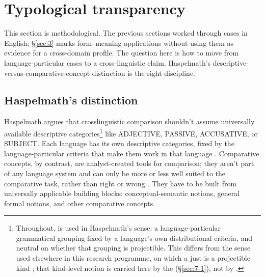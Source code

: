 \section{Typological transparency}\label{sec:6}

This section is methodological. The previous sections worked through cases in English; §\ref{sec:3} marks form--meaning applications without using them as evidence for a cross-domain profile. The question here is how to move from language-particular cases to a cross-linguistic claim. Haspelmath's \autocite*{haspelmath-2010-comparative-concepts} descriptive-versus-comparative-concept distinction is the right discipline.

\subsection{Haspelmath's distinction}

Haspelmath \autocite*{haspelmath-2010-comparative-concepts} argues that crosslinguistic comparison shouldn't assume universally available descriptive categories\footnote{Throughout,  is used in Haspelmath's  sense: a language-particular grammatical grouping fixed by a language's own distributional criteria, and neutral on whether that grouping is projectible. This differs from the sense used elsewhere in this research programme, on which a  just is a projectible kind \autocite{reynolds2025hpcbook}; that kind-level notion is carried here by the  (§\ref{sec:7-1}), not by .} like ADJECTIVE, PASSIVE, ACCUSATIVE, or SUBJECT. Each language has its own descriptive categories, fixed by the language-particular criteria that make them work in that language \autocite[664]{haspelmath-2010-comparative-concepts}. Comparative concepts, by contrast, are analyst-created tools for comparison; they aren't part of any language system and can only be more or less well suited to the comparative task, rather than right or wrong \autocite[665]{haspelmath-2010-comparative-concepts}. They have to be built from universally applicable building blocks: conceptual-semantic notions, general formal notions, and other comparative concepts.

